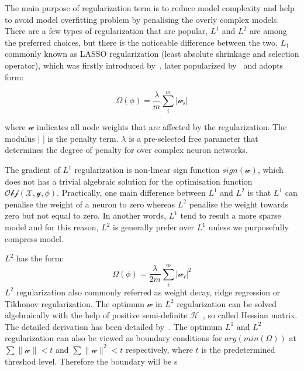 
The main purpose of regularization term is to reduce model complexity and help to avoid model overfitting problem by penalising the overly complex models. There are a few types of regularization that are popular, $L^1$ and $L^2$ are among the preferred choices, but there is the noticeable difference between the two. $L_1$ commonly known as LASSO regularization (least absolute shrinkage and selection operator), which was firstly introduced by~\citet{Santosa_1986}, later popularized by~\citet{Tibshirani_1996} and adopts form:

\begin{equation}
   \Omega(\phi) = \frac{\lambda}{m} \sum_i^m | \mathcal{w_i} |
\end{equation}

where $\mathcal{w}$ indicates all node weights that are affected by the regularization. The modulus |  | is the penalty term. $\lambda$ is a pre-selected free parameter that determines the degree of penalty for over complex neuron networks. 
\par 
The gradient of $L^1$ regularization is non-linear sign function $sign (\mathcal{w})$, which does not has a trivial algebraic solution for the optimisation function $\mathcal{Obj}(\mathcal{X},\mathcal{y},\phi)$. Practically, one main difference between $L^1$ and $L^2$ is that $L^1$ can penalise the weight of a neuron to zero whereas $L^2$ penalise the weight towards zero but not equal to zero. In another words, $L^1$ tend to result a more sparse model and for this reason, $L^2$ is generally prefer over $L^1$ unless we purposefully compress model.

$L^2$ has the form:
\begin{equation}
   \Omega(\phi) = \frac{\lambda}{2m} \sum_i^m | \mathcal{w_i} |^2
\end{equation}
$L^2$ regularization also commonly referred as weight decay, ridge regression or Tikhonov regularization. The optimum $\mathcal{w}$ in $L^2$ regularization can be solved algebraically with the help of positive semi-definite $\mathcal{H}$~\cite{Goodfellow-et-al-2016}, so called Hessian matrix. The detailed derivation has been detailed by~\citet{Goodfellow-et-al-2016}. The optimum $L^1$ and $L^2$ regularization can also be viewed as boundary conditions for $arg (min (\Omega)) $ at $\sum \parallel \mathcal{w} \parallel < t $ and  $\sum \parallel \mathcal{w} \parallel^2 < t $ respectively, where $t$ is the predetermined threshod level. Therefore the boundary will be s